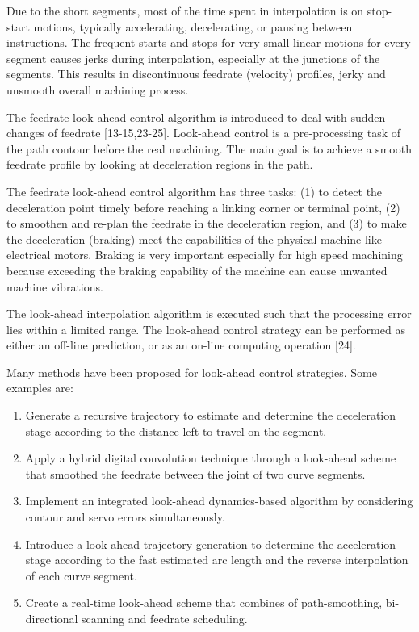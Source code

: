 Due to the short segments, most of the time spent in interpolation is on stop-start motions, typically accelerating, decelerating, or pausing between instructions. The frequent starts and stops for very small linear motions for every segment causes jerks during interpolation, especially at the junctions of the segments. This results in discontinuous feedrate (velocity) profiles, jerky and unsmooth overall machining process. 
\vspace*{1\baselineskip}

The feedrate look-ahead control algorithm is introduced to deal with sudden changes of feedrate [13-15,23-25]. Look-ahead control is a pre-processing task of the path contour before the real machining. The main goal is to achieve a smooth feedrate profile by looking at deceleration regions in the path. 
\vspace*{1\baselineskip}

The feedrate look-ahead control algorithm has three tasks: (1) to detect the deceleration point timely before reaching a linking corner or terminal point, (2) to smoothen and re-plan the feedrate in the deceleration region, and (3) to make the deceleration (braking) meet the capabilities of the physical machine like electrical motors. Braking is very important especially for high speed machining because exceeding the braking capability of the machine can cause unwanted machine vibrations. 
\vspace*{1\baselineskip}

The look-ahead interpolation algorithm is executed such that the processing error lies within a limited range. The look-ahead control strategy can be performed as either an off-line prediction, or as an on-line computing operation [24]. 
\vspace*{1\baselineskip}

Many methods have been proposed for look-ahead control strategies. Some examples are:

\begin{enumerate}
	\item Generate a recursive trajectory to estimate and determine the deceleration stage according to the distance left to travel on the segment. 
	
	\item Apply a hybrid digital convolution technique through a look-ahead scheme that smoothed the feedrate between the joint of two curve segments. 
	
	\item Implement an integrated look-ahead dynamics-based algorithm by considering contour and servo errors simultaneously.
	
	\item Introduce a look-ahead trajectory generation to determine the acceleration stage according to the fast estimated arc length and the reverse interpolation of each curve segment. 
	
	\item Create a real-time look-ahead scheme that combines of path-smoothing, bi-directional scanning and feedrate scheduling.
\end{enumerate}

